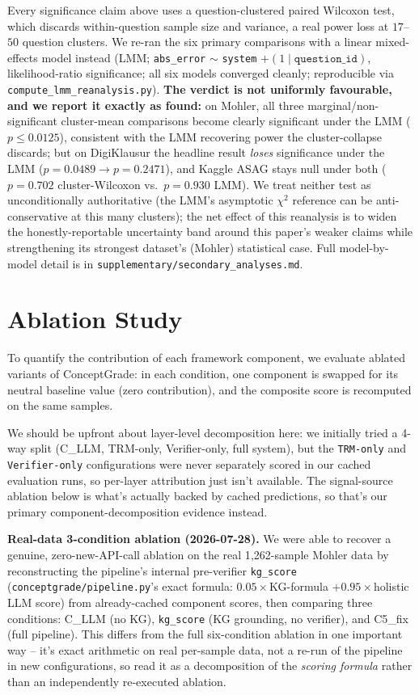 \documentclass[conference]{IEEEtran}
\begin{document}
Every significance claim above uses a question-clustered paired
Wilcoxon test, which discards within-question sample size and
variance, a real power loss at $17$--$50$ question clusters. We
re-ran the six primary comparisons with a linear mixed-effects model
instead (LMM; \texttt{abs\_error} $\sim$ \texttt{system} $+ (1 \mid
\texttt{question\_id})$, likelihood-ratio significance; all six models
converged cleanly; reproducible via \texttt{compute\_lmm\_reanalysis.py}).
\textbf{The verdict is not uniformly favourable, and we report it
exactly as found:} on Mohler, all three marginal/non-significant
cluster-mean comparisons become clearly significant under the LMM
($p\le0.0125$), consistent with the LMM recovering power the
cluster-collapse discards; but on DigiKlausur the headline result
\emph{loses} significance under the LMM ($p=0.0489\to p=0.2471$), and
Kaggle ASAG stays null under both ($p=0.702$ cluster-Wilcoxon vs.\
$p=0.930$ LMM). We treat neither test as unconditionally authoritative
(the LMM's asymptotic $\chi^2$ reference can be anti-conservative at
this many clusters); the net effect of this reanalysis is to widen the
honestly-reportable uncertainty band around this paper's weaker
claims while strengthening its strongest dataset's (Mohler)
statistical case. Full model-by-model detail is in
\texttt{supplementary/secondary\_analyses.md}.

\section{Ablation Study}
\label{sec:ablation}

To quantify the contribution of each framework component, we evaluate
ablated variants of ConceptGrade: in each condition, one component is
swapped for its neutral baseline value (zero contribution), and the
composite score is recomputed on the same samples.

We should be upfront about layer-level decomposition here: we
initially tried a 4-way split (C\_LLM, TRM-only, Verifier-only, full
system), but the \texttt{TRM-only} and \texttt{Verifier-only}
configurations were never separately scored in our cached evaluation
runs, so per-layer attribution just isn't available. The signal-source
ablation below is what's actually backed by cached predictions, so
that's our primary component-decomposition evidence instead.

\textbf{Real-data 3-condition ablation (2026-07-28).} We were able to
recover a genuine, zero-new-API-call ablation on the real
1{,}262-sample Mohler data by reconstructing the pipeline's internal
pre-verifier \texttt{kg\_score} (\texttt{conceptgrade/pipeline.py}'s
exact formula: $0.05\times$KG-formula $+ 0.95\times$holistic LLM
score) from already-cached component scores, then comparing three
conditions: C\_LLM (no KG), \texttt{kg\_score} (KG grounding, no
verifier), and C5\_fix (full pipeline). This differs from the full
six-condition ablation in one important way -- it's exact arithmetic
on real per-sample data, not a re-run of the pipeline in new
configurations, so read it as a decomposition of the \emph{scoring
formula} rather than an independently re-executed ablation.
\end{document}
